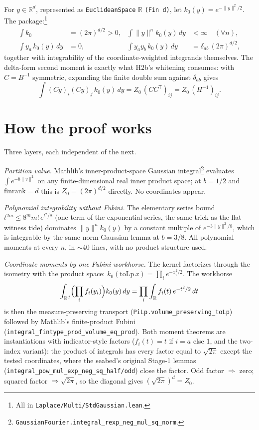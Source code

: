 \documentclass[11pt]{article}
\begin{document}
For $y \in \mathbb{R}^d$, represented as \texttt{EuclideanSpace}
$\mathbb{R}$ \texttt{(Fin d)}, let $k_0(y) = e^{-\|y\|^2/2}$. The
package:\footnote{All in \texttt{Laplace/Multi/StdGaussian.lean}.}
\begin{align*}
\int k_0 &= (2\pi)^{d/2} > 0,
&\int \|y\|^n k_0(y)\,dy &< \infty \quad (\forall n),\\
\int y_a\, k_0(y)\,dy &= 0,
&\int y_a y_b\, k_0(y)\,dy &= \delta_{ab}\,(2\pi)^{d/2},
\end{align*}
together with integrability of the coordinate-weighted integrands
themselves. The delta-form second moment is exactly what H2b's
whitening consumes: with $C = B^{-1}$ symmetric, expanding the
finite double sum against $\delta_{ab}$ gives
\[
\int (Cy)_i (Cy)_j\,k_0(y)\,dy
= Z_0\,(CC^{\mathsf T})_{ij} = Z_0\,(H^{-1})_{ij}.
\]

\section{How the proof works}

Three layers, each independent of the next.

\emph{Partition value.} Mathlib's inner-product-space Gaussian
integral\footnote{\texttt{GaussianFourier.integral\_rexp\_neg\_mul\_sq\_norm}.}
evaluates $\int e^{-b\|v\|^2}$ on any finite-dimensional real inner
product space; at $b = 1/2$ and
$\mathrm{finrank} = d$ this is $Z_0 = (2\pi)^{d/2}$ directly. No
coordinates appear.

\emph{Polynomial integrability without Fubini.} The elementary series
bound $t^{2m} \le 8^m m!\, e^{t^2/8}$ (one term of the exponential
series, the same trick as the flat-witness tide) dominates
$\|y\|^n k_0(y)$ by a constant multiple of $e^{-3\|y\|^2/8}$, which
is integrable by the same norm-Gaussian lemma at $b = 3/8$. All
polynomial moments at every $n$, in $\sim$40 lines, with no product
structure used.

\emph{Coordinate moments by one Fubini workhorse.} The kernel
factorizes through the isometry with the product space:
$k_0(\mathrm{toLp}\,x) = \prod_i e^{-x_i^2/2}$. The workhorse
\[
\int_{\mathbb{R}^d} \Bigl(\prod_i f_i(y_i)\Bigr) k_0(y)\,dy
= \prod_i \int_{\mathbb{R}} f_i(t)\,e^{-t^2/2}\,dt
\]
is then the measure-preserving transport
(\texttt{PiLp.volume\_preserving\_toLp}) followed by Mathlib's
finite-product Fubini
(\texttt{integral\_fintype\_prod\_volume\_eq\_prod}). Both moment
theorems are instantiations with indicator-style factors
($f_i(t) = t$ if $i = a$ else $1$, and the two-index variant): the
product of integrals has every factor equal to $\sqrt{2\pi}$ except
the tested coordinates, where the seabed's original Stage-1 lemmas
(\texttt{integral\_pow\_mul\_exp\_neg\_sq\_half/odd}) close the
factor. Odd factor $\Rightarrow$ zero; squared factor
$\Rightarrow \sqrt{2\pi}$, so the diagonal gives
$(\sqrt{2\pi})^d = Z_0$.
\end{document}
